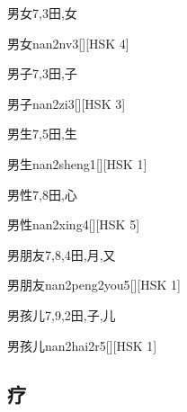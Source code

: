 \begin{Entry}{男女}{7,3}{⽥,⼥}
  \begin{Phonetics}{男女}{nan2nv3}[][HSK 4]
  \end{Phonetics}
\end{Entry}

\begin{Entry}{男子}{7,3}{⽥,⼦}
  \begin{Phonetics}{男子}{nan2zi3}[][HSK 3]
  \end{Phonetics}
\end{Entry}

\begin{Entry}{男生}{7,5}{⽥,⽣}
  \begin{Phonetics}{男生}{nan2sheng1}[][HSK 1]
  \end{Phonetics}
\end{Entry}

\begin{Entry}{男性}{7,8}{⽥,⼼}
  \begin{Phonetics}{男性}{nan2xing4}[][HSK 5]
  \end{Phonetics}
\end{Entry}

\begin{Entry}{男朋友}{7,8,4}{⽥,⽉,⼜}
  \begin{Phonetics}{男朋友}{nan2peng2you5}[][HSK 1]
  \end{Phonetics}
\end{Entry}

\begin{Entry}{男孩儿}{7,9,2}{⽥,⼦,⼉}
  \begin{Phonetics}{男孩儿}{nan2hai2r5}[][HSK 1]
  \end{Phonetics}
\end{Entry}

\subsection*{疗}


